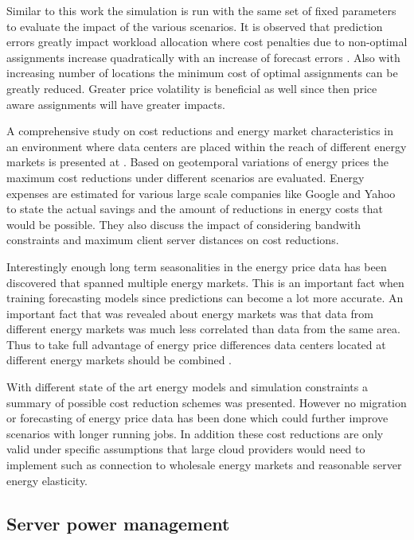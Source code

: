 Similar to this work the simulation is run with the same set of fixed parameters to evaluate the impact of the various scenarios. It is observed that prediction errors greatly impact workload allocation where cost penalties due to non-optimal assignments increase quadratically with an increase of forecast errors \cite{de2013study}. Also with increasing number of locations the minimum cost of optimal assignments can be greatly reduced. Greater price volatility is beneficial as well since then price aware assignments will have greater impacts. 

A comprehensive study on cost reductions and energy market characteristics in an environment where data centers are placed within the reach of different energy markets is presented at \cite{qureshi2009cutting}. Based on geotemporal variations of energy prices the maximum cost reductions under different scenarios are evaluated. Energy expenses are estimated for various large scale companies like Google and Yahoo to state the actual savings and the amount of reductions in energy costs that would be possible. 
They also discuss the impact of considering bandwith constraints and maximum client server distances on cost reductions. 

Interestingly enough long term seasonalities in the energy price data has been discovered that spanned multiple energy markets. This is an important fact when training forecasting models since predictions can become a lot more accurate. An important fact that was revealed about energy markets was that data from different energy markets was much less correlated than data from the same area. Thus to take full advantage of energy price differences data centers located at different energy markets should be combined \cite{qureshi2009cutting}. 

With different state of the art energy models and simulation constraints a summary of possible cost reduction schemes was presented. However no migration or forecasting of energy price data has been done which could further improve scenarios with longer running jobs. In addition these cost reductions are only valid under specific assumptions that large cloud providers would need to implement such as connection to wholesale energy markets and reasonable server energy elasticity. 




\subsection{Server power management}

